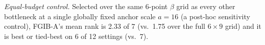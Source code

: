 \emph{Equal-budget control.} Selected over the same 6-point $\beta$ grid as every other bottleneck at a single globally fixed anchor scale $a=16$ (a post-hoc sensitivity control), FGIB-A's mean rank is 2.33 of 7 (vs.\ 1.75 over the full $6\times9$ grid) and it is best or tied-best on 6 of 12 settings (vs.\ 7).
